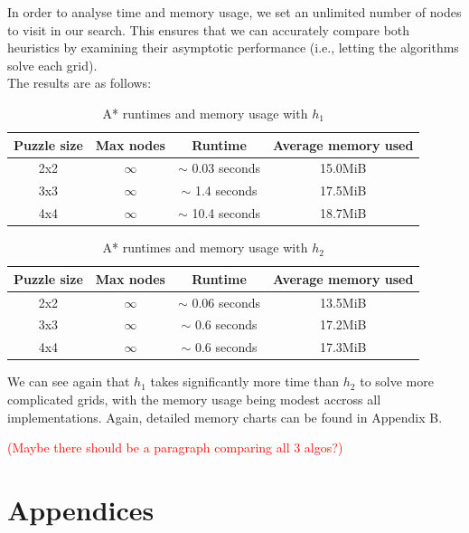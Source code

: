 \documentclass[runningheads]{llncs}
\begin{document}
In order to analyse time and memory usage, we set an unlimited number of nodes to visit in our search. This ensures that we can accurately compare both heuristics by examining their asymptotic performance (i.e., letting the algorithms solve each grid). \\

The results are as follows:

\begin{table}
    \centering
    \caption{A* runtimes and memory usage with $h_1$}\label{tab1}
    \begin{tabular}{|c|c|c|c|}
        \hline
        \textbf{Puzzle size} & \textbf{Max nodes} & \textbf{Runtime} & \textbf{Average memory used} \\
        \hline
        2x2 & $\infty$ & $\sim$ 0.03 seconds & 15.0MiB \\ \hline
        3x3 & $\infty$ & $\sim$ 1.4 seconds & 17.5MiB \\ \hline
        4x4 & $\infty$ & $\sim$ 10.4 seconds & 18.7MiB \\ \hline
    \end{tabular}
\end{table}
\begin{table}
    \centering
    \caption{A* runtimes and memory usage with $h_2$}\label{tab2}
    \begin{tabular}{|c|c|c|c|}
        \hline
        \textbf{Puzzle size} & \textbf{Max nodes} & \textbf{Runtime} & \textbf{Average memory used} \\
        \hline
        2x2 & $\infty$ & $\sim$ 0.06 seconds & 13.5MiB \\ \hline
        3x3 & $\infty$ & $\sim$ 0.6 seconds & 17.2MiB \\ \hline
        4x4 & $\infty$ & $\sim$ 0.6 seconds & 17.3MiB \\ \hline
    \end{tabular}
\end{table}

We can see again that $h_1$ takes significantly more time than $h_2$ to solve more complicated grids, with the memory usage being modest accross all implementations. Again, detailed memory charts can be found in Appendix B.

\textcolor{red}{(Maybe there should be a paragraph comparing all 3 algos?)}

\section{Appendices}
\end{document}
